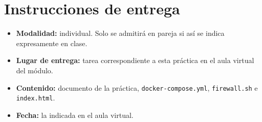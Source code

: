 \documentclass[a4paper]{article}
\begin{document}
\section{Instrucciones de entrega}
\label{sec:org9997052}

\begin{itemize}
\item \textbf{Modalidad:} individual. Solo se admitirá en pareja si así se indica expresamente en clase.
\item \textbf{Lugar de entrega:} tarea correspondiente a esta práctica en el aula virtual del módulo.
\item \textbf{Contenido:} documento de la práctica, \texttt{docker-compose.yml}, \texttt{firewall.sh} e \texttt{index.html}.
\item \textbf{Fecha:} la indicada en el aula virtual.
\end{itemize}
\end{document}
